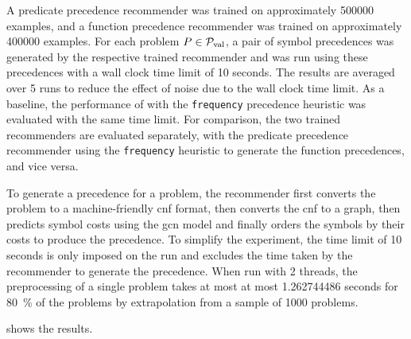 A predicate precedence recommender was trained on approximately \num{500000} examples,
and a function precedence recommender was trained on approximately \num{400000} examples.
For each problem $P \in \operatorname{\mathcal{P}_{\mathrm{val}}}$,
a pair
 of symbol precedences was generated by the respective trained recommender
and \Vampire{} was run using these precedences
with a wall clock time limit of 10 seconds.
The results are averaged over 5 runs to reduce the effect of noise due to the wall clock time limit.
As a baseline, the performance of \Vampire{} with the \texttt{frequency} precedence heuristic was evaluated
with the same time limit.
For comparison, the two trained recommenders are evaluated separately,
with the predicate precedence recommender using the \texttt{frequency} heuristic to generate the function precedences, and vice versa.

To generate a precedence for a problem,
the recommender first converts the problem to a machine-friendly \gls{cnf} format,
then converts the \gls{cnf} to a graph,
then predicts symbol costs using the \gls{gcn} model
and finally orders the symbols by their costs to produce the precedence.
To simplify the experiment, the time limit of 10 seconds is only imposed on the \Vampire{} run
and excludes the time taken by the recommender to generate the precedence.
When run with 2 threads,
the preprocessing of a single problem
takes at most at most \num[round-mode=places,round-precision=2]{1.262744486} seconds
for \SI{80}{\percent} of the problems
by extrapolation from a sample of \num{1000} problems.

 shows the results.


